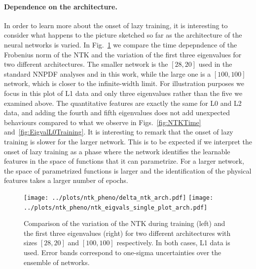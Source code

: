 \FloatBarrier

\paragraph{Dependence on the architecture.}
In order to learn more about the onset of lazy training, it is interesting to consider what happens to 
the picture sketched so far as the architecture of the neural networks is varied. In Fig.~\ref{fig:NTKTimeDiffArch}
we compare the time depepndence of the Frobenius norm of the NTK and the variation of the first three eigenvalues
for two different architectures. The smaller network is the $[28,20]$ used in the standard NNPDF
analyses and in this work, while the large one is a $[100,100]$ network, which is closer to the infinite-width
limit. For illustration purposes we focus in this plot of L1 data and only three eigenvalues rather than the five
we examined above. The quantitative features are exactly the same for L0 and L2 data, and adding the fourth 
and fifth eigenvalues does not add unexpected behaviours compared to what we observe in Figs.~\ref{fig:NTKTime} 
and~\ref{fig:EigvalL0Training}. It is interesting to remark that the onset of lazy training is slower 
for the larger network. This is to be expected if we interpret the onset of lazy training as a phase where 
the network identifies the learnable features in the space of functions that it can parametrize. For a 
larger network, the space of parametrized functions is larger and the identification of the physical 
features takes a larger number of epochs. 
\begin{figure}[ht!]
  \centering
  \texttt{[image: ../plots/ntk\_pheno/delta\_ntk\_arch.pdf]}
  \texttt{[image: ../plots/ntk\_pheno/ntk\_eigvals\_single\_plot\_arch.pdf]}
  \caption{Comparison of the variation of the NTK during training (left) and the
  first three eigenvalues (right) for two different architectures with sizes
  $[28,20]$ and $[100,100]$ respectively. In both cases, L1 data is used. Error
  bands correspond to one-sigma uncertainties over the ensemble of networks.}
  \label{fig:NTKTimeDiffArch}
\end{figure}

\FloatBarrier

